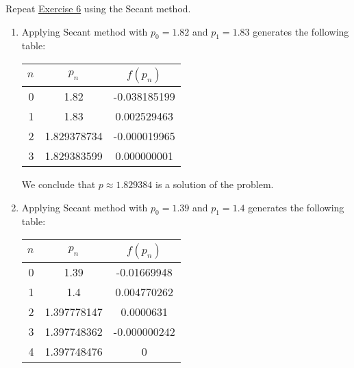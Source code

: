\documentclass[../../../../Assignments]{subfiles}
\begin{document}
\begin{exercise}
    Repeat \hyperref[exer:2.3.6]{Exercise 6} using the Secant method.
\end{exercise}

\begin{solution}
    \begin{enumerate}[label = \alph*)]
        \item Applying Secant method with \(p_0 = \num{1.82}\) and \(p_1 =
            \num{1.83}\) generates the following table:

            \begin{table}[H]
                \centering
                \begin{tabular}{r S[table-format=1.9] S[table-format=-1.9]}
                    \toprule
                    \(n\)  &   {\(p_n\)}   &  {\(f(p_n)\)}  \\
                      &  1.82         &  -0.038185199  \\
                        1  &  1.83         &   0.002529463  \\
                        2  &  1.829378734  &  -0.000019965  \\
                        3  &  1.829383599  &   0.000000001  \\
                    \bottomrule
                \end{tabular}
            \end{table}

            We conclude that \(p \approx \num{1.829384}\) is a solution of the
            problem.

        \item Applying Secant method with \(p_0 = \num{1.39}\) and \(p_1 =
            \num{1.4}\) generates the following table:

            \begin{table}[H]
                \centering
                \begin{tabular}{r S[table-format=1.9] S[table-format=-1.9]}
                    \toprule
                    \(n\)  &   {\(p_n\)}   &  {\(f(p_n)\)}  \\
                      &  1.39         &  -0.01669948   \\
                        1  &  1.4          &   0.004770262  \\
                        2  &  1.397778147  &   0.0000631    \\
                        3  &  1.397748362  &  -0.000000242  \\
                        4  &  1.397748476  &   0            \\
                    \bottomrule
                \end{tabular}
            \end{table}


\end{enumerate}
\end{solution}
\end{document}
